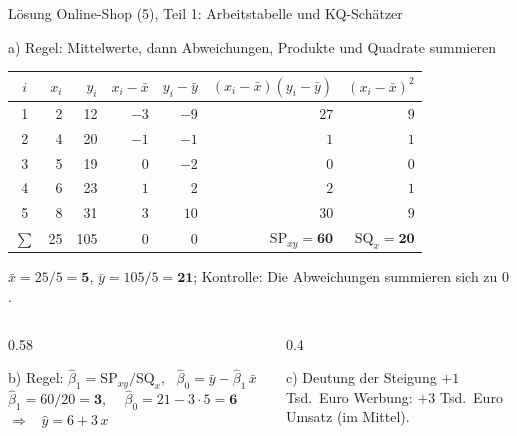 \documentclass[aspectratio=169,11pt]{beamer}
\newcommand{\SQx}{\text{SQ}_x}
\newcommand{\SPxy}{\text{SP}_{xy}}
\begin{document}
\begin{frame}{Lösung Online-Shop (5), Teil 1: Arbeitstabelle und KQ-Schätzer}
  \begin{block}{a) Regel: Mittelwerte, dann Abweichungen, Produkte und Quadrate summieren}
    \vspace{-4pt}
    \begin{center}
      \footnotesize
      \renewcommand{\arraystretch}{0.95}
      \begin{tabular}{crrrrrr}
        \toprule
        $i$ & $x_i$ & $y_i$ & $x_i - \bar{x}$ & $y_i - \bar{y}$ & $(x_i - \bar{x})(y_i - \bar{y})$ & $(x_i - \bar{x})^{2}$ \\
        \midrule
        1 & 2 & 12 & $-3$ & $-9$ & $27$ & $9$ \\
        2 & 4 & 20 & $-1$ & $-1$ & $1$  & $1$ \\
        3 & 5 & 19 & $0$  & $-2$ & $0$  & $0$ \\
        4 & 6 & 23 & $1$  & $2$  & $2$  & $1$ \\
        5 & 8 & 31 & $3$  & $10$ & $30$ & $9$ \\
        \midrule
        $\sum$ & 25 & 105 & $0$ & $0$ & $\SPxy = \mathbf{60}$ & $\SQx = \mathbf{20}$ \\
        \bottomrule
      \end{tabular}
    \end{center}
    \small $\bar{x} = 25/5 = \mathbf{5}$, \quad $\bar{y} = 105/5 = \mathbf{21}$; \quad
    Kontrolle: Die Abweichungen summieren sich zu $0$.
  \end{block}
  \vspace{-4pt}

  \begin{columns}[T]
    \begin{column}{0.58\textwidth}
      \begin{block}{b) Regel: $\hat{\beta}_1 = \SPxy/\SQx$, \ $\hat{\beta}_0 = \bar{y} - \hat{\beta}_1\,\bar{x}$}
        $\hat{\beta}_1 = 60/20 = \mathbf{3}$, \ \ $\hat{\beta}_0 = 21 - 3 \cdot 5 = \mathbf{6}$
        \ $\Rightarrow$ \ $\hat{y} = 6 + 3\,x$
      \end{block}
    \end{column}
    \begin{column}{0.4\textwidth}
      \begin{exampleblock}{c) Deutung der Steigung}
        $+1$ Tsd.~Euro Werbung: $+3$ Tsd.~Euro Umsatz (im Mittel).
      \end{exampleblock}
    \end{column}
  \end{columns}
\end{frame}
\end{document}

